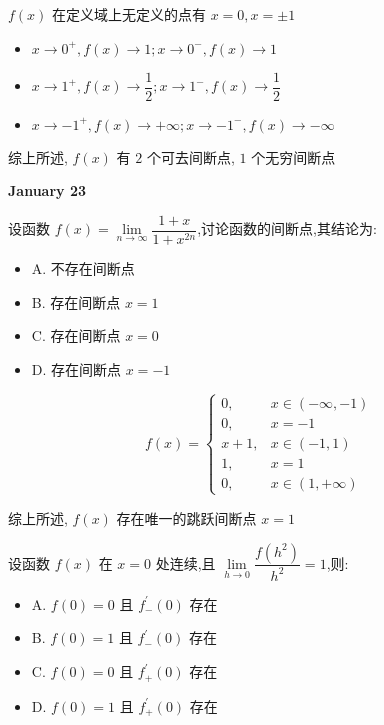 \begin{solution}

	$f(x)$ 在定义域上无定义的点有 $x=0, x=\pm 1$
	\begin{itemize}
		\item $x\to 0^{+}, f(x)\to 1 ; x\to 0^{-}, f(x)\to 1$
		\item $x\to 1^{+}, f(x)\to \dfrac{1}{2} ; x\to 1^{-}, f(x)\to \dfrac{1}{2}$
		\item $x\to -1^{+}, f(x)\to +\infty ; x\to -1^{-}, f(x)\to -\infty$
	\end{itemize}

	综上所述, $f(x)$ 有 $2$ 个可去间断点, $1$ 个无穷间断点
\end{solution}

\textcolor{purplea}{\textbf{January 23}}

\begin{example}[][Exam: 27.4.3]
	设函数 $f(x)=\lim\limits_{n\to \infty}\dfrac{1+x}{1+x^{2n}}$,讨论函数的间断点,其结论为:
\begin{itemize}
	\item A. 不存在间断点
	\item B. 存在间断点 $x=1$
	\item C. 存在间断点 $x=0$
	\item D. 存在间断点 $x=-1$
\end{itemize}
\end{example}

\begin{solution}

	$$f(x) = \begin{cases}
	0, & x\in(-\infty,-1)\\
	0, & x = -1\\
	x+1, & x\in(-1,1)\\
	1, & x = 1\\
	0, & x\in(1,+\infty)
	\end{cases}$$

	综上所述, $f(x)$ 存在唯一的跳跃间断点 $x = 1$
\end{solution}

\begin{example}[][Exam: 27.4.4]
	设函数 $f(x)$ 在 $x=0$ 处连续,且 $\lim\limits_{h\to 0}\dfrac{f(h^{2})}{h^{2}}=1$,则:
\begin{itemize}
	\item A. $f(0)=0$ 且 $f_{-}^{'}(0)$ 存在
	\item B. $f(0)=1$ 且 $f_{-}^{'}(0)$ 存在
	\item C. $f(0)=0$ 且 $f_{+}^{'}(0)$ 存在
	\item D. $f(0)=1$ 且 $f_{+}^{'}(0)$ 存在
\end{itemize}
\end{example}


